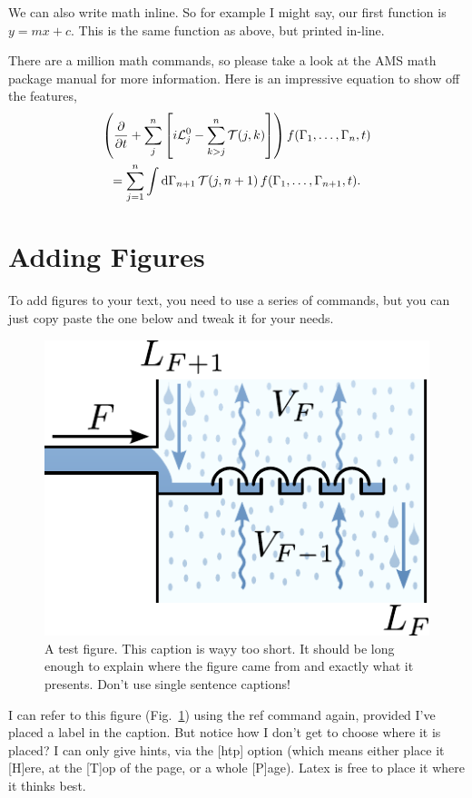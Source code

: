 \documentclass[12pt]{UoAThesis}
\begin{document}
We can also write math inline. So for example I might say, our first
function is $y=mx+c$. This is the same function as above, but printed
in-line.

There are a million math commands, so please take a look at the AMS
math package manual for more information. Here is an impressive 
equation to show off the features,
\begin{multline}
  \left( \frac{\partial}{\partial t} + \sum_{j}^n \left[ i{\mathcal
        L}^0_j - \sum_{k > j}^n {\mathcal T}(j,k) \right]\right)
  f({\Gamma}_1,\dots,{\Gamma}_n,t)
  \\
  = \sum_{j=1}^{n} \int {\rm d}{\Gamma}_{n+1}\, {\mathcal T}(j,n+1)\,
  f({\Gamma}_1,\dots,{\Gamma}_{n+1},t).
\end{multline}

\section{Adding Figures}
To add figures to your text, you need to use a series of commands, but
you can just copy paste the one below and tweak it for your needs.
\begin{figure}[htp]
  \centering
  \includegraphics[clip,width=0.5\linewidth]{figures/testfig}
  \caption{\label{fig:testfig} A test figure. This caption is wayy too
    short. It should be long enough to explain where the figure came
    from and exactly what it presents. Don't use single sentence captions!}
\end{figure}

I can refer to this figure (Fig.~\ref{fig:testfig}) using the ref
command again, provided I've placed a label in the caption. But notice
how I don't get to choose where it is placed? I can only give hints,
via the [htp] option (which means either place it [H]ere, at the [T]op
of the page, or a whole [P]age). Latex is free to place it where it
thinks best.
\end{document}
